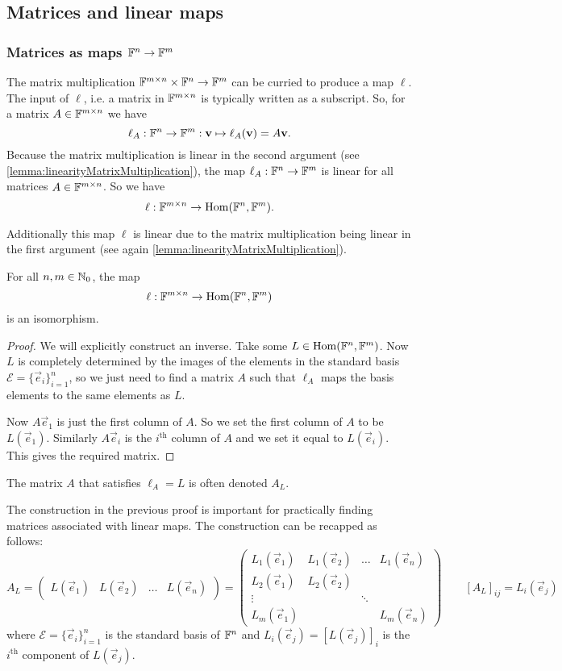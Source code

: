 \subsection{Matrices and linear maps}
\subsubsection{Matrices as maps $\mathbb{F}^n\to \mathbb{F}^m$}
The matrix multiplication $\mathbb{F}^{m\times n}\times \mathbb{F}^n \to \mathbb{F}^m$ can be curried to produce a map $\ell$. The input of $\ell$, i.e. a matrix in $\mathbb{F}^{m\times n}$ is typically written as a subscript. So, for a matrix $A\in\mathbb{F}^{m\times n}$ we have
\[ \ell_A: \mathbb{F}^n \to \mathbb{F}^m: \bm{\mathrm{v}}\mapsto \ell_A(\bm{\mathrm{v}}) = A\bm{\mathrm{v}}. \]
Because the matrix multiplication is linear in the second argument (see \ref{lemma:linearityMatrixMultiplication}), the map $\ell_A: \mathbb{F}^n \to \mathbb{F}^m$ is linear for all matrices $A\in \mathbb{F}^{m\times n}$. So we have
\[ \ell: \mathbb{F}^{m\times n}\to \operatorname{Hom}(\mathbb{F}^n, \mathbb{F}^m). \]

Additionally this map $\ell$ is linear due to the matrix multiplication being linear in the first argument (see again \ref{lemma:linearityMatrixMultiplication}).

\begin{proposition} \label{prop:ellIsomorphism}
For all $n,m\in\mathbb{N}_0$, the map
\[ \ell: \mathbb{F}^{m\times n}\to \operatorname{Hom}(\mathbb{F}^n, \mathbb{F}^m) \]
is an isomorphism.
\end{proposition}
\begin{proof}
We will explicitly construct an inverse. Take some $L\in\operatorname{Hom}(\mathbb{F}^n, \mathbb{F}^m)$. Now $L$ is completely determined by the images of the elements in the standard basis $\mathcal{E}= \{\vec{e}_i\}_{i=1}^n$, so we just need to find a matrix $A$ such that $\ell_A$ maps the basis elements to the same elements as $L$.

Now $A\vec{e}_1$ is just the first column of $A$. So we set the first column of $A$ to be $L(\vec{e}_1)$. Similarly $A\vec{e}_i$ is the $i^\text{th}$ column of $A$ and we set it equal to $L(\vec{e}_i)$. This gives the required matrix.
\end{proof}
The matrix $A$ that satisfies $\ell_A = L$ is often denoted $A_L$.

The construction in the previous proof is important for practically finding matrices associated with linear maps. The construction can be recapped as follows:
\[ A_L = \begin{pmatrix}
L(\vec{e}_1) & L(\vec{e}_2) & \hdots & L(\vec{e}_n)
\end{pmatrix} = \begin{pmatrix}
L_1(\vec{e}_1) & L_1(\vec{e}_2) & \hdots & L_1(\vec{e}_n)  \\
L_2(\vec{e}_1) & L_2(\vec{e}_2) & & \\
\vdots & & \ddots & \\
L_m(\vec{e}_1) & & & L_m(\vec{e}_n)
\end{pmatrix} \qquad [A_L]_{ij} = L_i(\vec{e}_j) \]
where $\mathcal{E}= \{\vec{e}_i\}_{i=1}^n$ is the standard basis of $\mathbb{F}^n$ and $L_i(\vec{e}_j) = [L(\vec{e}_j)]_i$ is the $i^\text{th}$ component of $L(\vec{e}_j)$.

